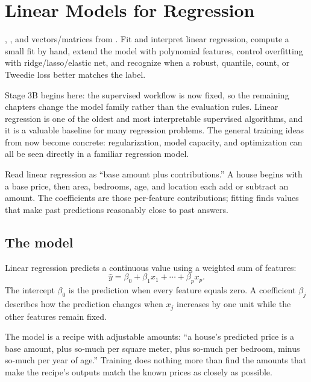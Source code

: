 \chapter{Linear Models for Regression}
\label{ch:regression}

\chapterguide%
  {, , and vectors/matrices from .}
  {Fit and interpret linear regression, compute a small fit by hand, extend the model with polynomial features, control overfitting with ridge/lasso/elastic net, and recognize when a robust, quantile, count, or Tweedie loss better matches the label.}

Stage 3B begins here: the supervised workflow is now fixed, so the remaining chapters change the model family rather than the evaluation rules. Linear regression is one of the oldest and most interpretable supervised algorithms, and it is a valuable baseline for many regression problems. The general training ideas from  now become concrete: regularization, model capacity, and optimization can all be seen directly in a familiar regression model.

\begin{firstread}
Read linear regression as ``base amount plus contributions.'' A house begins with a base price, then area, bedrooms, age, and location each add or subtract an amount. The coefficients are those per-feature contributions; fitting finds values that make past predictions reasonably close to past answers.
\end{firstread}

\section{The model}

Linear regression predicts a continuous value using a weighted sum of features:
\[
  \hat{y}=\beta_0+\beta_1x_1+\cdots+\beta_{p}x_{p}.
\]
The intercept $\beta_0$ is the prediction when every feature equals zero. A coefficient $\beta_j$ describes how the prediction changes when $x_j$ increases by one unit while the other features remain fixed.

\begin{intuition}
The model is a recipe with adjustable amounts: ``a house's predicted price is a base amount, plus so-much per square meter, plus so-much per bedroom, minus so-much per year of age.'' Training does nothing more than find the amounts that make the recipe's outputs match the known prices as closely as possible.
\end{intuition}

